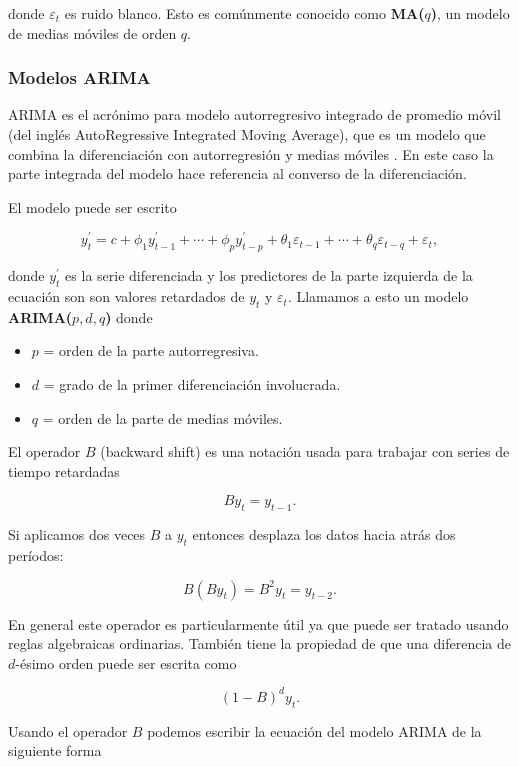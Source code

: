 donde $\varepsilon_{t}$ es ruido blanco. Esto es comúnmente conocido como \textbf{MA($q$)}, un modelo de medias móviles de orden $q$.

\subsubsection{Modelos ARIMA}

ARIMA es el acrónimo para modelo autorregresivo integrado de promedio móvil (del inglés AutoRegressive Integrated Moving Average), que es un modelo que combina la diferenciación con autorregresión y medias móviles \cite{hyndmanForecastingPrinciplesPractice}. En este caso la parte integrada del modelo hace referencia al converso de la diferenciación. 

El modelo puede ser escrito 

\[ y_{t}^{\prime}=c+\phi_{1} y_{t-1}^{\prime}+\cdots+\phi_{p} y_{t-p}^{\prime}+\theta_{1} \varepsilon_{t-1}+\cdots+\theta_{q} \varepsilon_{t-q}+\varepsilon_{t}, \]

donde $y_{t}^{\prime}$ es la serie diferenciada y los predictores de la parte izquierda de la ecuación son son valores retardados de $y_t$ y $\varepsilon_t$. Llamamos a esto un modelo \textbf{ARIMA($p,d,q$)} donde

\begin{itemize}
\item $p$ = orden de la parte autorregresiva.
\item $d$ = grado de la primer diferenciación involucrada.
\item $q$ = orden de la parte de medias móviles.
\end{itemize}

El operador $B$ (backward shift) es una notación usada para trabajar con series de tiempo retardadas

\[ B y_{t}=y_{t-1}. \]

Si aplicamos dos veces $B$ a $y_t$ entonces desplaza los datos hacia atrás dos períodos: 

\[B\left(B y_{t}\right)=B^{2} y_{t}=y_{t-2}.\]

En general este operador es particularmente útil ya que puede ser tratado usando reglas algebraicas ordinarias. También tiene la propiedad de que una diferencia de $d$-ésimo orden puede ser escrita como

\[
(1-B)^{d} y_{t}.
\]

Usando el operador $B$ podemos escribir la ecuación del modelo ARIMA de la siguiente forma

